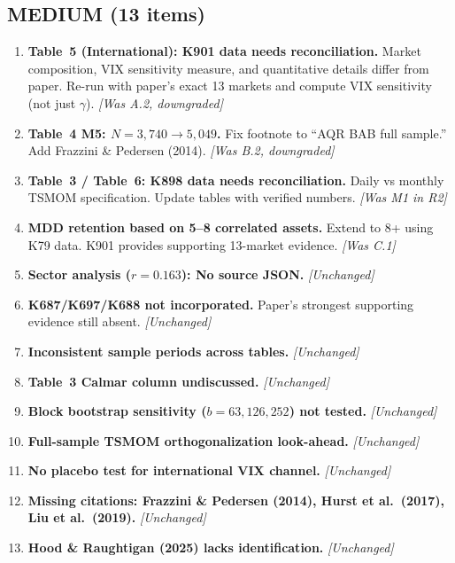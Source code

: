 \documentclass[12pt,a4paper]{article}
\begin{document}
\subsection*{\textcolor{medsev}{MEDIUM (13 items)}}

\begin{enumerate}[label=\textcolor{medsev}{\textbf{M\arabic*}}]

\item \textbf{Table~5 (International): K901 data needs reconciliation.} Market composition, VIX sensitivity measure, and quantitative details differ from paper. Re-run with paper's exact 13 markets and compute VIX sensitivity (not just $\gamma$). \textit{[Was A.2, downgraded]}

\item \textbf{Table~4 M5: $N = 3{,}740 \to 5{,}049$.} Fix footnote to ``AQR BAB full sample.'' Add Frazzini \& Pedersen (2014). \textit{[Was B.2, downgraded]}

\item \textbf{Table~3 / Table~6: K898 data needs reconciliation.} Daily vs monthly TSMOM specification. Update tables with verified numbers. \textit{[Was M1 in R2]}

\item \textbf{MDD retention based on 5--8 correlated assets.} Extend to 8+ using K79 data. K901 provides supporting 13-market evidence. \textit{[Was C.1]}

\item \textbf{Sector analysis ($r = 0.163$): No source JSON.} \textit{[Unchanged]}

\item \textbf{K687/K697/K688 not incorporated.} Paper's strongest supporting evidence still absent. \textit{[Unchanged]}

\item \textbf{Inconsistent sample periods across tables.} \textit{[Unchanged]}

\item \textbf{Table~3 Calmar column undiscussed.} \textit{[Unchanged]}

\item \textbf{Block bootstrap sensitivity ($b = 63, 126, 252$) not tested.} \textit{[Unchanged]}

\item \textbf{Full-sample TSMOM orthogonalization look-ahead.} \textit{[Unchanged]}

\item \textbf{No placebo test for international VIX channel.} \textit{[Unchanged]}

\item \textbf{Missing citations: Frazzini \& Pedersen (2014), Hurst et al.\ (2017), Liu et al.\ (2019).} \textit{[Unchanged]}

\item \textbf{Hood \& Raughtigan (2025) lacks identification.} \textit{[Unchanged]}

\end{enumerate}
\end{document}
